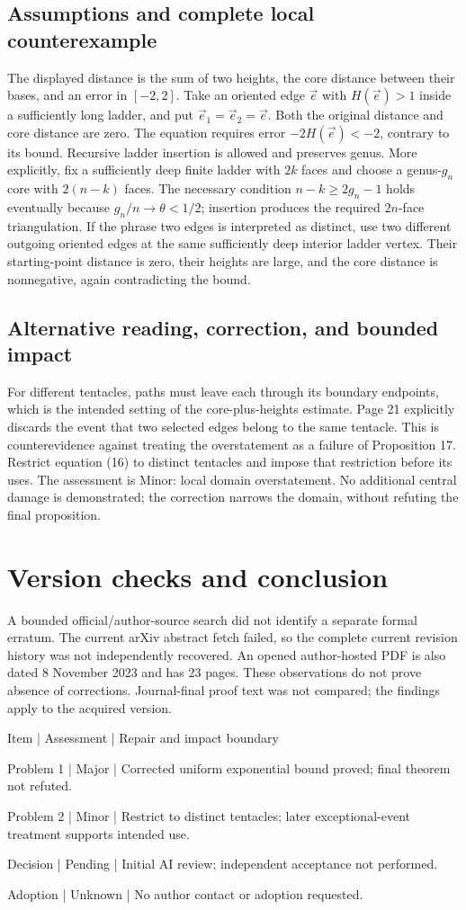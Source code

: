 \documentclass[10pt]{article}
\begin{document}
\subsection*{Assumptions and complete local counterexample}
The displayed distance is the sum of two heights, the core distance between their bases, and an error in \([-2,2]\). Take an oriented edge \(\vec e\) with \(H(\vec e)>1\) inside a sufficiently long ladder, and put \(\vec e_1=\vec e_2=\vec e\). Both the original distance and core distance are zero. The equation requires error \(-2H(\vec e)<-2\), contrary to its bound. Recursive ladder insertion is allowed and preserves genus. More explicitly, fix a sufficiently deep finite ladder with \(2k\) faces and choose a genus-\(g_n\) core with \(2(n-k)\) faces. The necessary condition \(n-k\geq2g_n-1\) holds eventually because \(g_n/n\to\theta<1/2\); insertion produces the required \(2n\)-face triangulation. If the phrase two edges is interpreted as distinct, use two different outgoing oriented edges at the same sufficiently deep interior ladder vertex. Their starting-point distance is zero, their heights are large, and the core distance is nonnegative, again contradicting the bound.\par
\subsection*{Alternative reading, correction, and bounded impact}
For different tentacles, paths must leave each through its boundary endpoints, which is the intended setting of the core-plus-heights estimate. Page 21 explicitly discards the event that two selected edges belong to the same tentacle. This is counterevidence against treating the overstatement as a failure of Proposition 17. Restrict equation (16) to distinct tentacles and impose that restriction before its uses. The assessment is Minor: local domain overstatement. No additional central damage is demonstrated; the correction narrows the domain, without refuting the final proposition.\par
\section*{Version checks and conclusion}
A bounded official/author-source search did not identify a separate formal erratum. The current arXiv abstract fetch failed, so the complete current revision history was not independently recovered. An opened author-hosted PDF is also dated 8 November 2023 and has 23 pages. These observations do not prove absence of corrections. Journal-final proof text was not compared; the findings apply to the acquired version.\par
Item | Assessment | Repair and impact boundary\par
Problem 1 | Major | Corrected uniform exponential bound proved; final theorem not refuted.\par
Problem 2 | Minor | Restrict to distinct tentacles; later exceptional-event treatment supports intended use.\par
Decision | Pending | Initial AI review; independent acceptance not performed.\par
Adoption | Unknown | No author contact or adoption requested.\par
\end{document}
